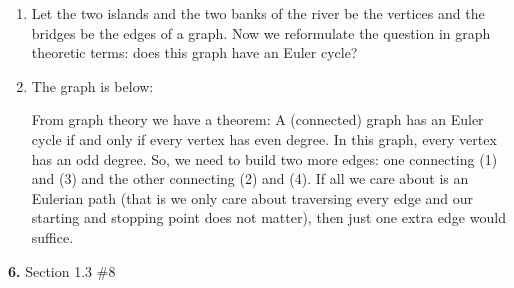 \documentclass[letterpaper, 11pt]{article}
\newcommand{\hwnumber}[3]{\medskip \noindent\textbf{#1.} Section #2 \##3 \smallskip}
\begin{document}
\begin{enumerate}[label = (\alph*)]
  \item Let the two islands and the two banks of the river be the vertices and the
    bridges be the edges of a graph. Now we reformulate the question in graph
    theoretic terms: does this graph have an Euler cycle?

   \item The graph is below:

     \begin{center}
   \end{center}

    From graph theory we have a theorem:
    A (connected) graph has an Euler cycle if and only if every vertex has even
    degree. In this graph, every vertex has an odd degree. So, we need to build
    two more edges: one connecting (1) and (3) and the other connecting (2)
    and (4). If all we care about is an Eulerian path (that is we only care
    about traversing every edge and our starting and stopping point does not
    matter), then just one extra edge would suffice. 
\end{enumerate}

\hwnumber{6}{1.3}{8}
\end{document}
